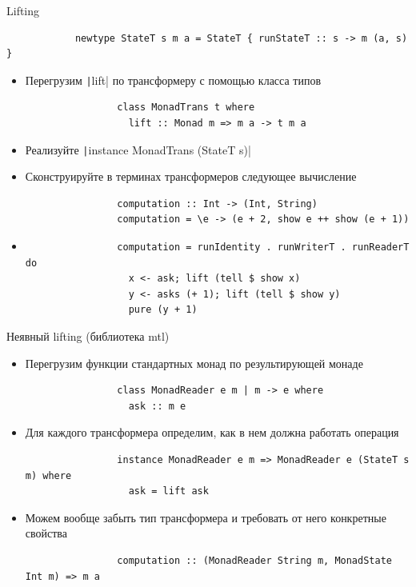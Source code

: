     \begin{frame}[fragile]{Lifting}
        \begin{verbatim}
            newtype StateT s m a = StateT { runStateT :: s -> m (a, s) }
        \end{verbatim}
        \begin{itemize}
            \item Перегрузим \texttt|lift| по трансформеру с помощью класса типов
            \begin{verbatim}
                class MonadTrans t where
                  lift :: Monad m => m a -> t m a
            \end{verbatim}
            \item[\todo] Реализуйте \texttt|instance MonadTrans (StateT s)|
            \item[\todo] Сконструируйте в терминах трансформеров следующее вычисление
            \begin{verbatim}
                computation :: Int -> (Int, String)
                computation = \e -> (e + 2, show e ++ show (e + 1))
            \end{verbatim}
            \item[\answer] \pause
            \begin{verbatim}
                computation = runIdentity . runWriterT . runReaderT do
                  x <- ask; lift (tell $ show x)
                  y <- asks (+ 1); lift (tell $ show y)
                  pure (y + 1)
            \end{verbatim}
        \end{itemize}
    \end{frame}

    \begin{frame}[fragile]{Неявный lifting (библиотека mtl)}
        \vspace{-0.5em}
        \begin{itemize}
            \item Перегрузим функции стандартных монад по результирующей монаде
            \begin{verbatim}
                class MonadReader e m | m -> e where
                  ask :: m e
            \end{verbatim}
            \item Для каждого трансформера определим, как в нем должна работать операция
            \begin{verbatim}
                instance MonadReader e m => MonadReader e (StateT s m) where
                  ask = lift ask
            \end{verbatim}
            \item Можем вообще забыть тип трансформера и требовать от него конкретные свойства
            \begin{verbatim}
                computation :: (MonadReader String m, MonadState Int m) => m a
            \end{verbatim}
        \end{itemize}
    \end{frame}

